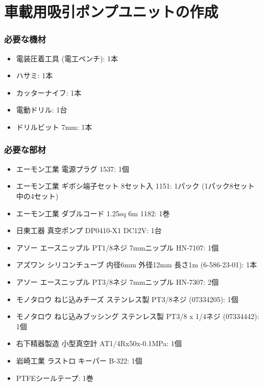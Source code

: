 \documentclass[titlepage,10pt,a4paper,uplatex]{jsbook}
\begin{document}
\section{車載用吸引ポンプユニットの作成}\label{makingpumpunit}

\subsubsection{必要な機材}
\begin{itemize}
\item 電装圧着工具 (電工ペンチ): 1本
\item ハサミ: 1本
\item カッターナイフ: 1本
\item 電動ドリル: 1台
\item ドリルビット 7mm: 1本
\end{itemize}

\subsubsection{必要な部材}
\begin{itemize}
\item エーモン工業 電源プラグ 1537: 1個
\item エーモン工業 ギボシ端子セット 8セット入 1151: 1パック (1パック8セット中の4セット)
\item エーモン工業 ダブルコード 1.25sq 6m 1182: 1巻
\item 日東工器 真空ポンプ DP0410-X1 DC12V: 1台
\item アソー エースニップル PT1/8ネジ 7mmニップル HN-7107: 1個
\item アズワン シリコンチューブ 内径6mm 外径12mm 長さ1m (6-586-23-01): 1本
\item アソー エースニップル PT3/8ネジ 7mmニップル HN-7307: 2個
\item モノタロウ ねじ込みチーズ ステンレス製 PT3/8ネジ (07334205): 1個
\item モノタロウ ねじ込みブッシング ステンレス製 PT3/8 x 1/4ネジ (07334442): 1個
\item 右下精器製造 小型真空計 AT1/4Rx50x-0.1MPa: 1個
\item 岩崎工業 ラストロ キーパー B-322: 1個
\item PTFEシールテープ: 1巻
\end{itemize}
\end{document}
